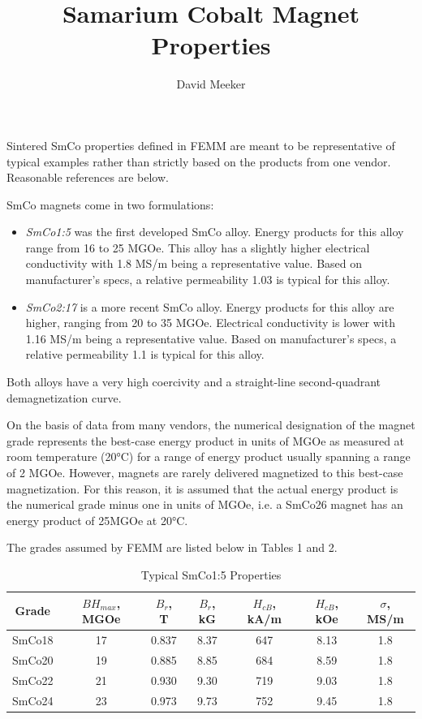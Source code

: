 \documentclass{article}
\begin{document}
\author{David Meeker}
\title{Samarium Cobalt Magnet Properties}
\maketitle

Sintered SmCo properties defined in FEMM are meant to be representative of typical examples rather than strictly based on the products from one vendor.  Reasonable references are below.

SmCo magnets come in two formulations: 

\begin{itemize}
\item \textit{SmCo1:5} was the first developed SmCo alloy.  Energy products for this alloy range from 16 to 25 MGOe.  This alloy has a slightly higher electrical conductivity with 1.8 MS/m being a representative value. Based on manufacturer's specs, a relative permeability 1.03 is typical for this alloy.
\item \textit{SmCo2:17} is a more recent SmCo alloy.  Energy products for this alloy are higher, ranging from 20 to 35 MGOe.  Electrical conductivity is lower with 1.16 MS/m being a representative value. Based on manufacturer's specs, a relative permeability 1.1 is typical for this alloy.
\end{itemize}

Both alloys have a very high coercivity and a straight-line second-quadrant demagnetization curve.

On the basis of data from many vendors, the numerical designation of the magnet grade represents the best-case energy product in units of MGOe as measured at room temperature (20°C) for a range of energy product usually spanning a range of 2 MGOe. However, magnets are rarely delivered magnetized to this best-case magnetization. For this reason, it is assumed that the actual energy product is the numerical grade minus one in units of MGOe, i.e. a SmCo26 magnet has an energy product of 25MGOe at 20°C.

The grades assumed by FEMM are listed below in Tables 1 and 2.

\begin{table}[htbp]
\centering
\begin{tabular}{|c|c|c|c|c|c|c|} 
\hline
Grade & \(BH_{max}\), MGOe & \(B_r\), T & \(B_r\), kG & \(H_{cB}\), kA/m & \(H_{cB}\), kOe & \(\sigma\), MS/m \\ \hline \hline
SmCo18 & 17 & 0.837 & 8.37 & 647 & 8.13 & 1.8 \\ \hline
SmCo20 & 19 & 0.885 & 8.85 & 684 & 8.59 & 1.8 \\ \hline
SmCo22 & 21 & 0.930 & 9.30 & 719 & 9.03 & 1.8 \\ \hline
SmCo24 & 23 & 0.973 & 9.73 & 752 & 9.45 & 1.8 \\ \hline
\end{tabular}
\caption{Typical SmCo1:5 Properties}
\end{table}
\end{document}
